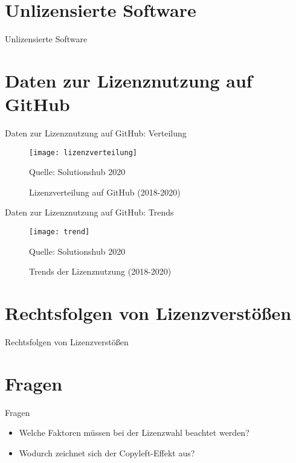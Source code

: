 \documentclass{beamer}
\begin{document}
\section{Unlizensierte Software}
\begin{frame}{Unlizensierte Software}
\end{frame}

\section{Daten zur Lizenznutzung auf GitHub}
\begin{frame}{Daten zur Lizenznutzung auf GitHub: Verteilung}
	\begin{figure}[ht]
		\texttt{[image: lizenzverteilung]}
		\centering
		\caption{Lizenzverteilung auf GitHub (2018-2020)}
		Quelle: Solutionshub 2020
	\end{figure}
\end{frame}

\begin{frame}{Daten zur Lizenznutzung auf GitHub: Trends}
	\begin{figure}[ht]
		\texttt{[image: trend]}
		\centering
		\caption{Trends der Lizenznutzung (2018-2020)}
		Quelle: Solutionshub 2020
	\end{figure}
\end{frame}

\section{Rechtsfolgen von Lizenzverstößen}
\begin{frame}{Rechtsfolgen von Lizenzverstößen}
\end{frame}

\section{Fragen}
\begin{frame}{Fragen}
	\begin{itemize}
		\item Welche Faktoren müssen bei der Lizenzwahl beachtet werden?
		\item Wodurch zeichnet sich der Copyleft-Effekt aus? %
	\end{itemize}
\end{frame}
\end{document}
